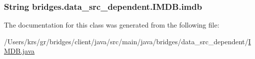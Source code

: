 \subsubsection[{imdb}]{\setlength{\rightskip}{0pt plus 5cm}String bridges.\+data\+\_\+src\+\_\+dependent.\+I\+M\+D\+B.\+imdb\hspace{0.3cm}{\ttfamily [protected]}}\label{classbridges_1_1data__src__dependent_1_1_i_m_d_b_a2913407abe6019a396d4a2ac086283df}


The documentation for this class was generated from the following file\+:\begin{DoxyCompactItemize}
\item 
/\+Users/krs/gr/bridges/client/java/src/main/java/bridges/data\+\_\+src\+\_\+dependent/\hyperlink{_i_m_d_b_8java}{I\+M\+D\+B.\+java}\end{DoxyCompactItemize}
